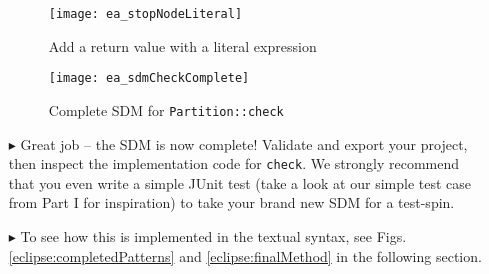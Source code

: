 \begin{itemize}
\begin{figure}[htbp]
\begin{center}
  \texttt{[image: ea\_stopNodeLiteral]}
  \caption{Add a return value with a literal expression}
  \label{ea:sdm_check_literal_exp}
\end{center}
\end{figure}

\begin{figure}[htbp]
\begin{center}
  \texttt{[image: ea\_sdmCheckComplete]}
  \caption{Complete SDM for \texttt{Partition::check}}
  \label{ea:sdm_check_finish}
\end{center}
\end{figure}

\clearpage

\item[$\blacktriangleright$] Great job -- the SDM is now complete! Validate and export your project, then inspect the implementation code for \texttt{check}. We
strongly recommend that you even write a simple JUnit test (take a look at our simple test case from Part I for inspiration) to take your brand new SDM for a
test-spin.

\item[$\blacktriangleright$] To see how this is implemented in the textual syntax, see Figs. \ref{eclipse:completedPatterns} and \ref{eclipse:finalMethod} in
the following section.


\end{itemize}

